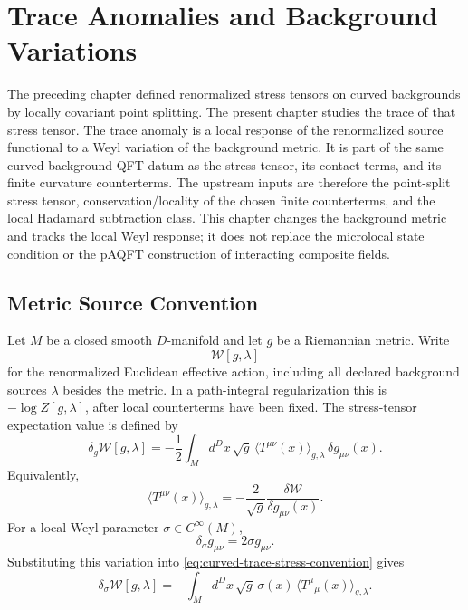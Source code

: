 \chapter{Trace Anomalies and Background Variations}
\label{ch:curved-trace-anomalies}

\ConventionsEuclidean

The preceding chapter defined renormalized stress tensors on curved
backgrounds by locally covariant point splitting.  The present chapter studies
the trace of that stress tensor.  The trace anomaly is a local response of
the renormalized source functional to a Weyl variation of the background
metric.  It is part of the same curved-background QFT datum as the stress
tensor, its contact terms, and its finite curvature counterterms.
The upstream inputs are therefore the point-split stress tensor,
conservation/locality of the chosen finite counterterms, and the local
Hadamard subtraction class.  This chapter changes the background metric and
tracks the local Weyl response; it does not replace the microlocal state
condition or the pAQFT construction of interacting composite fields.

\section{Metric Source Convention}

Let \(M\) be a closed smooth \(D\)-manifold and let \(g\) be a Riemannian
metric.  Write
\[
  \mathcal W[g,\lambda]
\]
for the renormalized Euclidean effective action, including all declared
background sources \(\lambda\) besides the metric.  In a path-integral
regularization this is \(-\log Z[g,\lambda]\), after local counterterms have
been fixed.  The stress-tensor expectation value is defined by
\begin{equation}
  \delta_g\mathcal W[g,\lambda]
  =
  -\frac12\int_M d^D x\,\sqrt g\,
  \langle T^{\mu\nu}(x)\rangle_{g,\lambda}\,
  \delta g_{\mu\nu}(x).
  \label{eq:curved-trace-stress-convention}
\end{equation}
Equivalently,
\[
  \langle T^{\mu\nu}(x)\rangle_{g,\lambda}
  =
  -\frac{2}{\sqrt g}
  \frac{\delta\mathcal W}{\delta g_{\mu\nu}(x)} .
\]
For a local Weyl parameter \(\sigma\in C^\infty(M)\),
\[
  \delta_\sigma g_{\mu\nu}=2\sigma g_{\mu\nu}.
\]
Substituting this variation into
\eqref{eq:curved-trace-stress-convention} gives
\begin{equation}
  \delta_\sigma\mathcal W[g,\lambda]
  =
  -\int_M d^D x\,\sqrt g\,
  \sigma(x)\,\langle T^\mu{}_\mu(x)\rangle_{g,\lambda}.
  \label{eq:curved-trace-weyl-response}
\end{equation}


